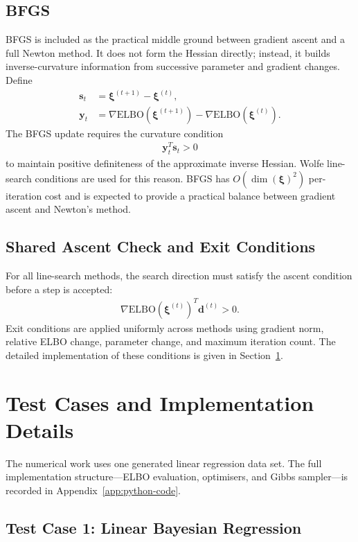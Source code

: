 \documentclass[11pt,a4paper]{article}
\newcommand{\ELBO}{\text{ELBO}}
\begin{document}
\subsection{BFGS}

BFGS is included as the practical middle ground between gradient ascent and a full Newton method. It does not form the Hessian directly; instead, it builds inverse-curvature information from successive parameter and gradient changes. Define
\begin{align}
\bm{s}_t &= \bm{\xi}^{(t+1)} - \bm{\xi}^{(t)},\\
\bm{y}_t &= \nabla\ELBO(\bm{\xi}^{(t+1)}) - \nabla\ELBO(\bm{\xi}^{(t)}).
\end{align}
The BFGS update requires the curvature condition
\begin{align}
\bm{y}_t^T\bm{s}_t > 0
\end{align}
to maintain positive definiteness of the approximate inverse Hessian. Wolfe line-search conditions are used for this reason. BFGS has $O(\dim(\bm{\xi})^2)$ per-iteration cost and is expected to provide a practical balance between gradient ascent and Newton's method.

\subsection{Shared Ascent Check and Exit Conditions}

For all line-search methods, the search direction must satisfy the ascent condition before a step is accepted:
\begin{align}
\nabla\ELBO(\bm{\xi}^{(t)})^T\bm{d}^{(t)} > 0.
\end{align}
Exit conditions are applied uniformly across methods using gradient norm, relative ELBO change, parameter change, and maximum iteration count. The detailed implementation of these conditions is given in Section~\ref{sec:implementation-details}.

\section{Test Cases and Implementation Details}
\label{sec:implementation-details}

The numerical work uses one generated linear regression data set. The full implementation structure---ELBO evaluation, optimisers, and Gibbs sampler---is recorded in Appendix~\ref{app:python-code}.

\subsection{Test Case 1: Linear Bayesian Regression}
\end{document}
